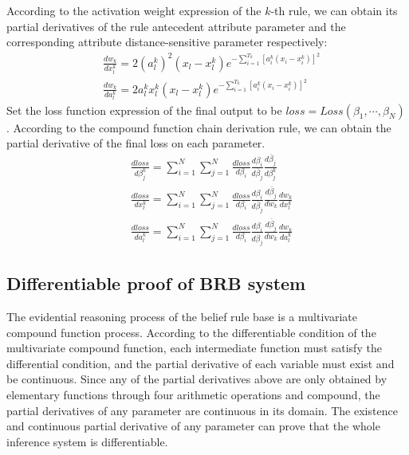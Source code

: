 \documentclass{ieeeaccess}
\begin{document}
According to the activation weight expression of the $k$-th rule, we can obtain its partial derivatives of the rule antecedent attribute parameter and the corresponding attribute distance-sensitive parameter respectively:
\begin{align}
     & \frac{dw_k}{dx_l^k}=2(a_l^k)^2(x_l-x_l^k)e^{-\sum_{i=1}^{T_k}[a_i^k(x_i-x_i^k)]^2}  \\
     & \frac{dw_k}{da_l^k}=2a_l^kx_l^k(x_l-x_l^k)e^{-\sum_{i=1}^{T_k}[a_i^k(x_i-x_i^k)]^2}
\end{align}
Set the loss function expression of the final output to be $loss=Loss(\beta_1,\cdots,\beta_N)$.
According to the compound function chain derivation rule, we can obtain the partial derivative of the final loss on each parameter.
\begin{align}
     & \frac{dloss}{d\beta_j^k}=\sum_{i=1}^N\sum_{j=1}^N\frac{dloss}{d\beta_i}\frac{d\beta_i}{d\overline{\beta}_j}\frac{d\overline{\beta}_j}{d\beta_j^k}          \\
     & \frac{dloss}{dx_l^k}=\sum_{i=1}^N\sum_{j=1}^N\frac{dloss}{d\beta_i}\frac{d\beta_i}{d\overline{\beta}_j}\frac{d\overline{\beta}_j}{dw_k}\frac{dw_k}{dx_l^k} \\
     & \frac{dloss}{da_l^k}=\sum_{i=1}^N\sum_{j=1}^N\frac{dloss}{d\beta_i}\frac{d\beta_i}{d\overline{\beta}_j}\frac{d\overline{\beta}_j}{dw_k}\frac{dw_k}{da_l^k}
\end{align}

\subsection{Differentiable proof of BRB system}
The evidential reasoning process of the belief rule base is a multivariate compound function process. According to the differentiable condition of the multivariate compound function, each intermediate function must satisfy the differential condition,
and the partial derivative of each variable must exist and be continuous.
Since any of the partial derivatives above are only obtained by elementary functions through four arithmetic operations and compound,
the partial derivatives of any parameter are continuous in its domain.
The existence and continuous partial derivative of any parameter can prove that the whole inference system is differentiable.
\end{document}
